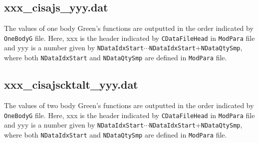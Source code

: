 \subsection{xxx\_cisajs\_yyy.dat }
The values of one body Green's functions are outputted in the order indicated by \verb|OneBodyG| file.
Here, xxx is the header indicated by \verb|CDataFileHead| in \verb|ModPara| file and yyy is a number given by \verb|NDataIdxStart|$\cdots$\verb|NDataIdxStart|+\verb|NDataQtySmp|, where both \verb|NDataIdxStart| and \verb|NDataQtySmp| are defined in \verb|ModPara| file.

\subsection{xxx\_cisajscktalt\_yyy.dat }
The values of two body Green's functions are outputted in the order indicated by \verb|OneBodyG| file.
Here, xxx is the header indicated by \verb|CDataFileHead| in \verb|ModPara| file and yyy is a number given by \verb|NDataIdxStart|$\cdots$\verb|NDataIdxStart|+\verb|NDataQtySmp|, where both \verb|NDataIdxStart| and \verb|NDataQtySmp| are defined in \verb|ModPara| file.
